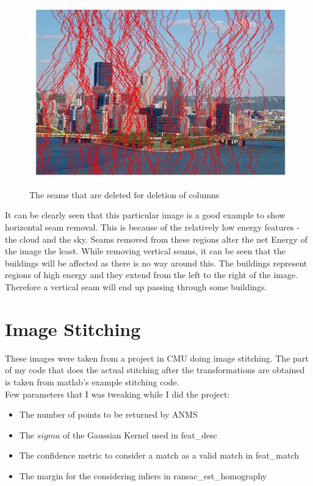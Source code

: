 \documentclass{article}
\begin{document}
\begin{figure}[h]
\centering
\includegraphics[scale=0.4]{verSeamRemoval.jpg}
\label{fig_seamVerResult}
\caption{The seams that are deleted for deletion of columns}
\end{figure}

\indent It can be clearly seen that this particular image is a good example to show horizontal seam removal. This is because of the relatively low energy features - the cloud and the sky. Seams removed from these regions alter the net Energy of the image the least. While removing vertical seams, it can be seen that the buildings will be affected as there is no way around this. The buildings represent regions of high energy and they extend from the left to the right of the image. Therefore a vertical seam will end up passing through some buildings.

\newpage

\section*{Image Stitching}


\indent These images were taken from a project in CMU doing image stitching. The part of my code that does the actual stitching after the transformations are obtained is taken from matlab's example stitching code.\\
Few parameters that I was tweaking while I did the project:
\begin{itemize}[noitemsep, nolistsep]
\item The number of points to be returned by ANMS
\item The $sigma$ of the Gaussian Kernel used in feat{\_}desc
\item The confidence metric to consider a match as a valid match in feat{\_}match
\item The margin for the considering inliers in ransac{\_}est{\_}homography
\end{itemize}
\end{document}
